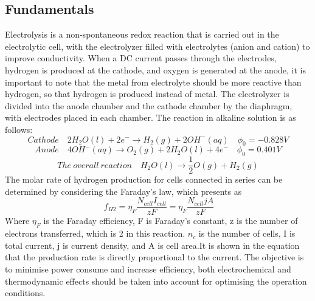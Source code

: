 \subsection{Fundamentals} 
Electrolysis is a non-spontaneous redox reaction that is carried out in the electrolytic cell, with the electrolyzer filled with electrolytes (anion and cation) to improve conductivity. When a DC current passes through the electrodes, hydrogen is produced at the cathode, and oxygen is generated at the anode, it is important to note that the metal from electrolyte should be more reactive than hydrogen, so that hydrogen is produced instead of metal. The electrolyzer is divided into the anode chamber and the cathode chamber by the diaphragm, with electrodes placed in each chamber. The reaction in alkaline solution is as follows:
\begin{equation} 
Cathode \quad 2H_2 O(l) + 2e^- \rightarrow H_2(g) + 2OH^-(aq)\quad   \phi_0=-0.828V
\end{equation} 
\begin{equation} 
Anode \quad 4OH^-(aq) \rightarrow O_2(g) +2H_2O(l) +4e^- \quad \phi_0=0.401V
\end{equation} 
\begin{equation} 
The \ overall \ reaction \quad H_2O(l) \rightarrow \frac{1}{2} O(g) + H_2(g) 
\end{equation} 
The molar rate of hydrogen production for cells connected in series can be determined by considering the Faraday's law, which presents as 
\begin{equation} 
\ f_{H2} = \eta_F \frac{N_{cell}I_{cell}}{zF} =\eta_F\frac{N_{cell} jA}{zF} 
\end{equation} 
Where $\eta_F$ is the Faraday efficiency, F is Faraday's constant, z is the number of electrons transferred, which is 2 in this reaction. $n_c$ is the number of cells, I is total current, j is current density, and A is cell area.It is shown in the equation that the production rate is directly proportional to the current. \cite{rate} The objective is to minimise power consume and increase efficiency, both electrochemical and thermodynamic effects should be taken into account for optimising the operation conditions.


